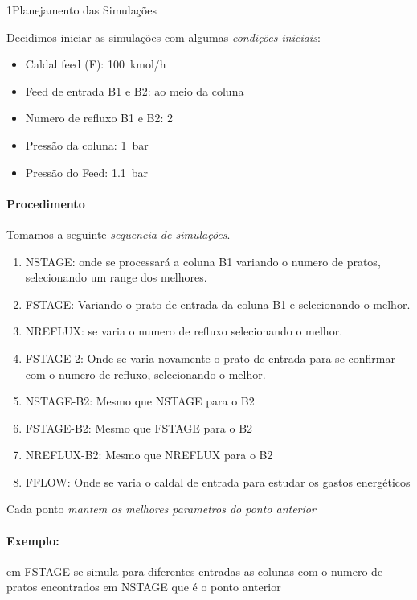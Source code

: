 \documentclass[\mainfilename]{subfiles}
\begin{document}
\begin{sectionBox}1{Planejamento das Simulações} %
    
    Decidimos iniciar as simulações com algumas \emph{condições iniciais}:
    \begin{itemize}
        \item Caldal feed (F): \qty*{100}{\kilo\mole/\hour}
        \item Feed de entrada B1 e B2: ao meio da coluna
        \item Numero de refluxo B1 e B2: 2
        \item Pressão da coluna: \qty*{1}{\bar}
        \item Pressão do Feed: \qty*{1.1}{\bar}
    \end{itemize}

    \paragraph*{Procedimento}
    Tomamos a seguinte \emph{sequencia de simulações}.
    \begin{enumerate}
        \item NSTAGE: onde se processará a coluna B1 variando o numero de pratos, selecionando um range dos melhores.
        \item FSTAGE: Variando o prato de entrada da coluna B1 e selecionando o melhor.
        \item NREFLUX: se varia o numero de refluxo selecionando o melhor.
        \item FSTAGE-2: Onde se varia novamente o prato de entrada para se confirmar com o numero de refluxo, selecionando o melhor.
        \item NSTAGE-B2: Mesmo que NSTAGE para o B2
        \item FSTAGE-B2: Mesmo que FSTAGE para o B2
        \item NREFLUX-B2: Mesmo que NREFLUX para o B2
        \item FFLOW: Onde se varia o caldal de entrada para estudar os gastos energéticos
    \end{enumerate}

    Cada ponto \emph{mantem os melhores parametros do ponto anterior}\vspace{-3ex}
    \paragraph*{Exemplo:} em FSTAGE se simula para diferentes entradas as colunas com o numero de pratos encontrados em NSTAGE que é o ponto anterior
    
\end{sectionBox}
\end{document}
